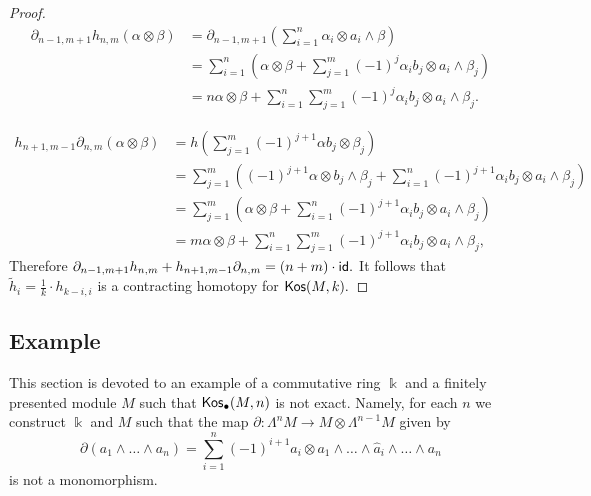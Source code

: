 \documentclass{amsart}
\numberwithin{equation}{section}
\theoremstyle{definition}
\def\kk{\Bbbk}
\begin{document}
\begin{proof}
\begin{equation*}
\begin{split}
\partial_{n-1,m+1} h_{n,m} (\alpha \otimes \beta ) &=  \partial_{n-1,m+1} \left(  \sum_{i=1}^n \alpha_i \otimes a_i \wedge \beta\right)\\
&=  \sum_{i=1}^n \left( \alpha \otimes \beta +  \sum_{j=1}^m (-1)^{j} \alpha_ib_j \otimes a_i \wedge \beta_j \right)\\
&=   n \alpha \otimes \beta +  \sum_{i=1}^n \sum_{j=1}^m (-1)^{j} \alpha_ib_j \otimes a_i \wedge \beta_j.
\end{split}
\end{equation*}

\begin{equation*}
\begin{split}
h_{n+1,m-1}\partial_{n,m}( \alpha \otimes \beta ) &= h\left( \sum_{j=1}^m (-1)^{j+1} \alpha b_j \otimes \beta_j \right) \\
& = \sum_{j=1}^m ( (-1)^{j+1} \alpha \otimes b_j \wedge \beta_j +   \sum_{i=1}^n (-1)^{j+1} \alpha_i b_j \otimes a_i \wedge \beta_j )\\
& = \sum_{j=1}^m (  \alpha \otimes  \beta +   \sum_{i=1}^n (-1)^{j+1} \alpha_i b_j \otimes a_i \wedge \beta_j )
\\
& = m \alpha\otimes \beta + \sum_{i=1}^n \sum_{j=1}^m (-1)^{j+1} \alpha_i b_j \otimes a_i \wedge \beta_j,
\end{split}    
\end{equation*}
 Therefore
$\partial_{n-1,m+1} h_{n,m} + h_{n+1,m-1} \partial_{n,m} = (n+m) \cdot {\sf id}.$
It follows that $\tilde h_i = \frac{1}{k} \cdot h_{k-i,i}$ is a contracting homotopy for ${\sf Kos}(M,k).$
\end{proof}






\subsection{Example}

This section is devoted to an example of a commutative ring $\kk$ and a finitely presented module $M$ such that ${\sf Kos}_\bullet(M,n)$ is not exact. Namely, for each $n$ we construct $\kk$ and $M$ such that the map $\partial:\Lambda^n M\to M \otimes \Lambda^{n-1}M $ given by 
$$\partial(a_1\wedge \dots \wedge a_n)= \sum_{i=1}^n (-1)^{i+1} a_i \otimes a_1\wedge \dots \wedge \hat a_i \wedge \dots \wedge a_n$$ is not a monomorphism. 
\end{document}
